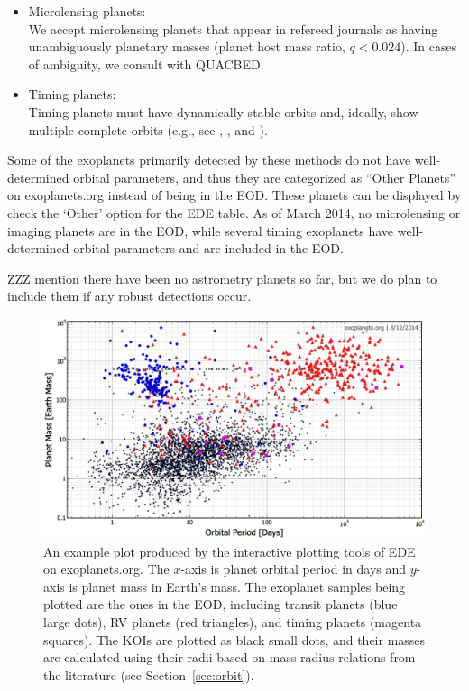 \documentclass[11pt,preprint]{aastex}
\begin{document}
\begin{CJK*}{UTF8}{gbsn}
\begin{itemize}
\begin{enumerate}
\end{enumerate}
\item Microlensing planets:\\
We accept microlensing planets that appear in refereed journals as
having unambiguously planetary masses (planet host mass ratio,
$q<0.024$). In cases of ambiguity, we consult with QUACBED.  

\item Timing planets:\\
 Timing planets must have dynamically stable orbits and, ideally, show
 multiple complete orbits (e.g., see \citealt{Wittenmyer2012},
 \citealt{Horner2012}, and \citealt{Wittenmyer2013}). 

\end{itemize}
Some of the exoplanets primarily detected by these methods do not have
well-determined orbital parameters, and thus they are categorized as
``Other Planets'' on exoplanets.org instead of being in the EOD. These
planets can be displayed by check the `Other' option for the EDE
table. As of March 2014, no microlensing or imaging planets are in the
EOD, while several timing exoplanets have well-determined orbital
parameters and are included in the EOD.

ZZZ mention there have been no astrometry planets so far, but we do
plan to include them if any robust detections occur.


\begin{figure}[!htb]
\centering
\includegraphics[width=\textwidth]{../fig/mass-per-color.eps}
\caption{An example plot produced by the interactive plotting tools of
  EDE on exoplanets.org. The $x$-axis is planet orbital period in days
  and $y$-axis is planet mass in Earth's mass. The exoplanet samples
  being plotted are the ones in the EOD, including transit planets
  (blue large dots), RV planets (red triangles), and timing planets
  (magenta squares). The KOIs are plotted as black small dots, and
  their masses are calculated using their radii based on mass-radius
  relations from the literature (see Section~\ref{sec:orbit}).}
\label{fig:koi}
\end{figure}



\end{CJK*}
\end{document}
